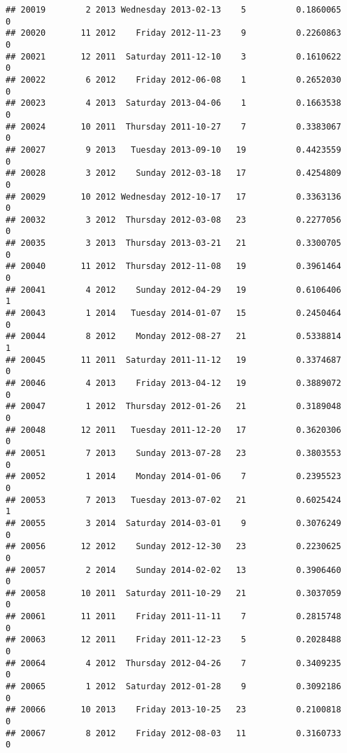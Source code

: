 \documentclass[
]{article}
\begin{document}
\begin{verbatim}
## 20019        2 2013 Wednesday 2013-02-13    5          0.1860065             0
## 20020       11 2012    Friday 2012-11-23    9          0.2260863             0
## 20021       12 2011  Saturday 2011-12-10    3          0.1610622             0
## 20022        6 2012    Friday 2012-06-08    1          0.2652030             0
## 20023        4 2013  Saturday 2013-04-06    1          0.1663538             0
## 20024       10 2011  Thursday 2011-10-27    7          0.3383067             0
## 20027        9 2013   Tuesday 2013-09-10   19          0.4423559             0
## 20028        3 2012    Sunday 2012-03-18   17          0.4254809             0
## 20029       10 2012 Wednesday 2012-10-17   17          0.3363136             0
## 20032        3 2012  Thursday 2012-03-08   23          0.2277056             0
## 20035        3 2013  Thursday 2013-03-21   21          0.3300705             0
## 20040       11 2012  Thursday 2012-11-08   19          0.3961464             0
## 20041        4 2012    Sunday 2012-04-29   19          0.6106406             1
## 20043        1 2014   Tuesday 2014-01-07   15          0.2450464             0
## 20044        8 2012    Monday 2012-08-27   21          0.5338814             1
## 20045       11 2011  Saturday 2011-11-12   19          0.3374687             0
## 20046        4 2013    Friday 2013-04-12   19          0.3889072             0
## 20047        1 2012  Thursday 2012-01-26   21          0.3189048             0
## 20048       12 2011   Tuesday 2011-12-20   17          0.3620306             0
## 20051        7 2013    Sunday 2013-07-28   23          0.3803553             0
## 20052        1 2014    Monday 2014-01-06    7          0.2395523             0
## 20053        7 2013   Tuesday 2013-07-02   21          0.6025424             1
## 20055        3 2014  Saturday 2014-03-01    9          0.3076249             0
## 20056       12 2012    Sunday 2012-12-30   23          0.2230625             0
## 20057        2 2014    Sunday 2014-02-02   13          0.3906460             0
## 20058       10 2011  Saturday 2011-10-29   21          0.3037059             0
## 20061       11 2011    Friday 2011-11-11    7          0.2815748             0
## 20063       12 2011    Friday 2011-12-23    5          0.2028488             0
## 20064        4 2012  Thursday 2012-04-26    7          0.3409235             0
## 20065        1 2012  Saturday 2012-01-28    9          0.3092186             0
## 20066       10 2013    Friday 2013-10-25   23          0.2100818             0
## 20067        8 2012    Friday 2012-08-03   11          0.3160733             0

\end{verbatim}
\end{document}
